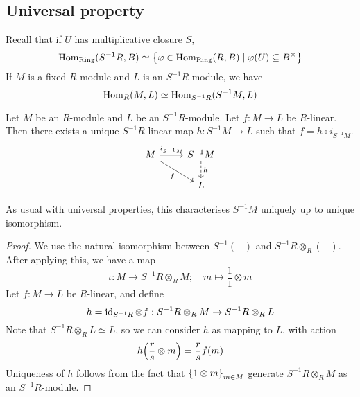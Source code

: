 \subsection{Universal property}
Recall that if \( U \) has multiplicative closure \( S \),
\[ \operatorname{Hom}_{\text{Ring}}(S^{-1}R, B) \simeq \qty{\varphi \in \operatorname{Hom}_{\text{Ring}}(R, B) \mid \varphi(U) \subseteq B^\times} \]
If \( M \) is a fixed \( R \)-module and \( L \) is an \( S^{-1}R \)-module, we have
\[ \operatorname{Hom}_R(M, L) \simeq \operatorname{Hom}_{S^{-1}R}(S^{-1}M, L) \]
\begin{proposition}
    Let \( M \) be an \( R \)-module and \( L \) be an \( S^{-1}R \)-module.
    Let \( f : M \to L \) be \( R \)-linear.
    Then there exists a unique \( S^{-1}R \)-linear map \( h : S^{-1}M \to L \) such that \( f = h \circ i_{S^{-1}M} \).
\[\begin{tikzcd}
	M & {S^{-1}M} \\
	& L
	\arrow["{i_{S^{-1}M}}", from=1-1, to=1-2]
	\arrow["h", dashed, from=1-2, to=2-2]
	\arrow["f"', from=1-1, to=2-2]
\end{tikzcd}\]
\end{proposition}
As usual with universal properties, this characterises \( S^{-1}M \) uniquely up to unique isomorphism.
\begin{proof}
    We use the natural isomorphism between \( S^{-1}(-) \) and \( S^{-1}R \otimes_R (-) \).
    After applying this, we have a map
    \[ \iota : M \to S^{-1}R \otimes_R M;\quad m \mapsto \frac{1}{1} \otimes m \]
    Let \( f : M \to L \) be \( R \)-linear, and define
    \[ h = \operatorname{id}_{S^{-1}R} \otimes f : S^{-1}R \otimes_R M \to S^{-1}R \otimes_R L \]
    Note that \( S^{-1}R \otimes_R L \simeq L \), so we can consider \( h \) as mapping to \( L \), with action
    \[ h\qty(\frac{r}{s} \otimes m) = \frac{r}{s}f(m) \]
    Uniqueness of \( h \) follows from the fact that \( \qty{1 \otimes m}_{m \in M} \) generate \( S^{-1}R \otimes_R M \) as an \( S^{-1}R \)-module.
\end{proof}

